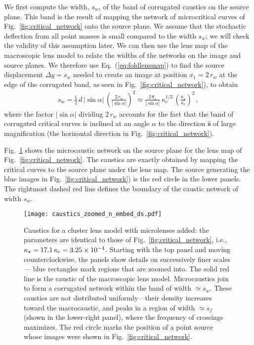 \documentclass{aastex6}
\newcommand{\bt}[1]{\mathbf #1}
\newcommand{\refeq}[1]{Eq.~(\ref{eq:#1})}
\newcommand{\reffig}[1]{Fig.~\ref{fig:#1}}
\begin{document}
We first compute the width, $s_w$, of the band of corrugated caustics on the source plane. This band is the result of mapping the network of microcritical curves of \reffig{critical_network} onto the source plane. We assume that the stochastic deflection from all point masses is small compared to the width $s_w$; we will check the validity of this assumption later. We can then use the lens map of the macroscopic lens model to relate the widths of the networks on the image and source planes. We therefore use \refeq{foldlensmap} to find the source displacement $\Delta y = s_w$ needed to create an image at position $x_1=2\,r_w$ at the edge of the corrugated band, as seen in \reffig{critical_network}), to obtain
\begin{align}
\label{eq:sw}
s_w = \frac12\, d\, |\sin\alpha |\,
 \left( \frac{2\,r_w}{|\sin\alpha |} \right)^2 \simeq
 \frac{2\, \theta_\star}{|\sin\alpha|} \, \kappa_c^{1/2} \,
 \left( \frac{\kappa_\star}{\kappa_c} \right)^2 \, ,
\end{align}
where the factor $|\sin\alpha|$ dividing $2\,r_w$ accounts for the fact that the band of corrugated critical curves is inclined at an angle $\alpha$ to the direction $\hat{\bt s}$ of large magnification (the horizontal direction in \reffig{critical_network}).

\reffig{caustics_network} shows the microcaustic network on the source plane for the lens map of \reffig{critical_network}. The caustics are exactly obtained by mapping the critical curves to the source plane under the lens map. The source generating the blue images in \reffig{critical_network}) is the red circle in the lower panels. The rightmost dashed red line defines the boundary of the caustic network of width $s_w$.

\begin{figure}[t]
\begin{center}
    \texttt{[image: caustics\_zoomed\_n\_embed\_ds.pdf]}
\caption{\label{fig:caustics_network} Caustics for a cluster lens model with microlenses added: the parameters are identical to those of \reffig{critical_network}, i.e., $\kappa_\star = 17.1\, \kappa_{\rm c} = 3.25 \times 10^{-4}$. Starting with the top panel and moving counterclockwise, the panels show details on successively finer scales---{\color{blue} blue} rectangles mark regions that are zoomed into. The solid {\color{red} red} line is the caustic of the macroscopic lens model. Microcaustics join to form a corrugated network within the band of width $\simeq s_w$. These caustics are not distributed uniformly---their density increases toward the macrocaustic, and peaks in a region of width $\simeq s_f$ (shown in the lower-right panel), where the frequency of crossings maximizes. The {\color{red} red} circle marks the position of a point source whose images were shown in \reffig{critical_network}.}
\end{center}
\end{figure}
\end{document}
